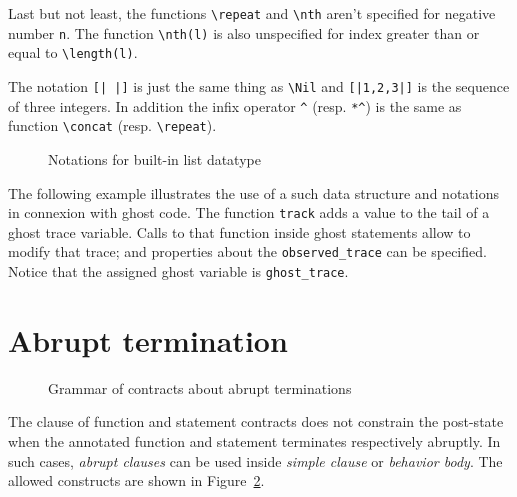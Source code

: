 Last but not least, the functions \lstinline|\repeat| and \lstinline|\nth| 
aren't specified for negative number \lstinline|n|. 
The function \lstinline|\nth(l)| is also unspecified for index greater than or 
equal to \lstinline|\length(l)|.

The notation \lstinline![| |]! is just the same thing as \lstinline|\Nil| and
\lstinline![|1,2,3|]! is the sequence of three integers.
In addition the infix operator \lstinline|^| (resp. \lstinline|*^|) 
is the same as function \lstinline|\concat| (resp. \lstinline|\repeat|).

\begin{figure}[t]
  \begin{cadre}
      
    \end{cadre}
  \caption{Notations for built-in list datatype}
\label{fig:gram:list}
\end{figure}

\begin{example}
  The following example illustrates the use of a such data structure and 
  notations in connexion with ghost code.
  The function \lstinline|track| adds a value to the tail of a ghost trace variable. 
  Calls to that function inside ghost statements allow to modify that trace; 
  and properties about the \lstinline|observed_trace| can be specified. 
  Notice that the assigned ghost variable is \lstinline|ghost_trace|.
\end{example}


\section{Abrupt termination}
\label{sec:abrupt-clause}

\begin{figure}[t]
  \begin{cadre}
     
    \end{cadre}
    \caption{Grammar of contracts about abrupt terminations}
  \label{fig:gram:abrupt-clauses}
\end{figure}

The \ensures{} clause of function and statement contracts
does not constrain the post-state when the annotated function and
statement terminates respectively abruptly. In such cases,
\textsl{abrupt clauses} can be used inside \textsl{simple clause} or
\textsl{behavior body}. The allowed constructs are shown in
Figure~\ref{fig:gram:abrupt-clauses}.

